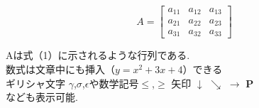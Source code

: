 \documentclass{jarticle}
\begin{document}
\begin{equation}
   A= \begin{bmatrix}
    a_{11} & a_{12} & a_{13}\\
    a_{21} & a_{22} & a_{23}\\
    a_{31} & a_{32} & a_{33}
   \end{bmatrix}
\end{equation}
\begin{flushleft}
Aは式（1）に示されるような行列である.\\
数式は文章中にも挿入（$ y = x^2 + 3x + 4$）できる\\
ギリシャ文字 $\gamma$,$\sigma$,$\epsilon$や数学記号$\leq$,$\geq$ 矢印 $\downarrow$ $\searrow$ $\to$ $\mathbf{P}$\\
なども表示可能.

\end{flushleft}
\end{document}

